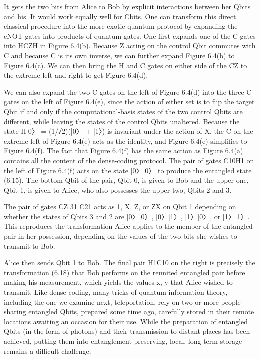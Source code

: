 \documentclass{book}
\begin{document}
 It gets the two bits from Alice to Bob by explicit interactions between her Qbits and his. It would work equally well for Cbits. One can transform this direct classical procedure into the more exotic quantum protocol by expanding the cNOT gates into products of quantum gates. One first expands one of the C gates into HCZH in Figure 6.4(b). Because Z acting on the control Qbit commutes with C and because C is its own inverse, we can further expand Figure 6.4(b) to Figure 6.4(c). We can then bring the H and C gates on either side of the CZ to the extreme left and right to get Figure 6.4(d).
 
 
 
 
  We can also expand the two C gates on the left of Figure 6.4(d) into the three C gates on the left of Figure 6.4(e), since the action of either set is to flip the target Qbit if and only if the computational-basis states of the two control Qbits are different, while leaving the states of the control Qbits unaltered. Because the state H|0〉 = (1/√2)(|0〉 + |1〉) is invariant under the action of X, the C on the extreme left of Figure 6.4(e) acts as the identity, and Figure 6.4(e) simplifies to Figure 6.4(f). The fact that Figure 6.4(f) has the same action as Figure 6.4(a) contains all the content of the dense-coding protocol. The pair of gates C10H1 on the left of Figure 6.4(f) acts on the state |0〉|0〉 to produce the entangled state (6.15). The bottom Qbit of the pair, Qbit 0, is given to Bob and the upper one, Qbit 1, is given to Alice, who also possesses the upper two, Qbits 2 and 3. 
  
  
  
  
  The pair of gates CZ 31 C21 acts as 1, X, Z, or ZX on Qbit 1 depending on whether the states of Qbits 3 and 2 are |0〉|0〉, |0〉|1〉, |1〉|0〉, or |1〉|1〉. This reproduces the transformation Alice applies to the member of the entangled pair in her possession, depending on the values of the two bits she wishes to transmit to Bob.
  
  
  
   Alice then sends Qbit 1 to Bob. The final pair H1C10 on the right is precisely the transformation (6.18) that Bob performs on the reunited entangled pair before making his measurement, which yields the values x, y that Alice wished to transmit. Like dense coding, many tricks of quantum information theory, including the one we examine next, teleportation, rely on two or more people sharing entangled Qbits, prepared some time ago, carefully stored in their remote locations awaiting an occasion for their use. While the preparation of entangled Qbits (in the form of photons) and their transmission to distant places has been achieved, putting them into entanglement-preserving, local, long-term storage remains a difficult challenge.
\end{document}
